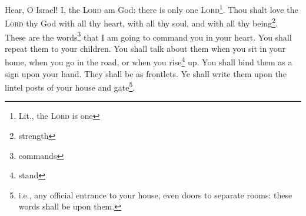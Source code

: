 
\begin{inparaenum}
     Hear, O Israel! I, the \textsc{Lord} am God: there is only one \textsc{Lord}\footnote{Lit., the \textsc{Lord} is one}.%
     Thou shalt love the \textsc{Lord} thy God with all thy heart, with all thy soul, and with all thy being\footnote{strength}.%
     These are the words\footnote{commands} that I am going to command you in your heart.%
     You shall repeat them to your children. You shall talk about them when you sit in your home, when you go in the road, or when you rise\footnote{stand} up.%
     You shall bind them as a sign upon your hand. They shall be as frontlets.%
     Ye shall write them upon the lintel posts of your house and gate\footnote{i.e., any official entrance to your house, even doors to separate rooms: these words shall be upon them.}.%
\end{inparaenum}
